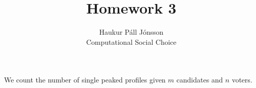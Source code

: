 \documentclass[12pt]{article}
\newenvironment{question}[2][Question]{\begin{trivlist}
\item[\hskip \labelsep {\bfseries #1}\hskip \labelsep {\bfseries #2.}]}{\end{trivlist}}
\begin{document}
\renewcommand{\theenumi}{\roman{enumi}}

\let\oldsum\sum
\renewcommand{\sum}[3]{\oldsum\limits_{#1}^{#2}#3}
\let\oldprod\prod
\renewcommand{\prod}[3]{\oldprod\limits_{#1}^{#2}#3}

\newcommand\Dunion{
  \mathop{\mathchoice
    {\ooalign{$\displaystyle\bigcup$\cr\hss\scalebox{.65}{\raisebox{0.45ex}{\sffamily +}}\hss}}
    {\ooalign{$\textstyle\bigcup$\cr\hss\scalebox{.9}{\raisebox{0.5ex}{\tiny\sffamily +}}\hss}}
    {\ooalign{$\scriptstyle\bigcup$\cr\hss\scalebox{.45}{\raisebox{0.3ex}{\sffamily +}}\hss}}
    {\ooalign{$\scriptscriptstyle\bigcup$\cr\hss\scalebox{.38}{\raisebox{0.3ex}{\sffamily +}}\hss}}
    }
}

\title{Homework 3}
\author{Haukur Páll Jónsson\\
Computational Social Choice}

\maketitle

\begin{question}{3}{}

We count the number of single peaked profiles given $m$ candidates and $n$ voters.
\end{question}
\end{document}
